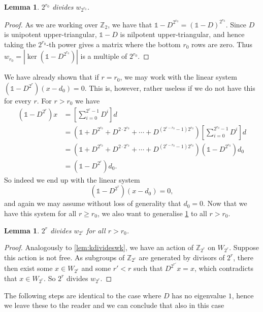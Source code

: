 \documentclass[a4paper]{article}
\theoremstyle{plain}
\newtheorem{lemma}[theorem]{Lemma}
\theoremstyle{definition}
\theoremstyle{remark}
\newcommand{\I}{\mathds{1}}
\newcommand{\ZZ}{{\mathbb{Z}}}
\begin{document}
\begin{lemma}
	\label{lem:2r0dividesw2r0}
	\(2^{r_0}\) divides \(w_{2^{r_0}}\).
\end{lemma}
\begin{proof}
	As we are working over \(\ZZ_2\), we have that \(\I-D^{2^{r_0}} = (\I-D)^{2^{r_0}}\). Since \(D\) is unipotent upper-triangular, \(\I-D\) is nilpotent upper-triangular, and hence taking the \(2^{r_0}\)-th power gives a matrix where the bottom \(r_0\) rows are zero. Thus \(w_{r_0} = |\ker(\I-D^{2^{r_0}})|\) is a multiple of \(2^{r_0}\).
\end{proof}
We have already shown that if \(r = r_0\), we may work with the linear system \((\I-D^{2^{r}})(x-d_0) = 0\). This is, however, rather useless if we do not have this for every \(r\). For \(r > r_0\) we have
\begin{align*}
(\I-D^{2^r})x &= \left[\sum_{i=0}^{2^{r}-1} D^i\right] d\\
&= (\I + D^{2^{r_0}} +  D^{2 \cdot 2^{r_0}} + \cdots +  D^{(2^{r-r_0}-1)2^{r_0}})\left[\sum_{i=0}^{2^{r_0}-1} D^i\right] d\\
&= (\I + D^{2^{r_0}} +  D^{2 \cdot 2^{r_0}} + \cdots +  D^{(2^{r-r_0}-1)2^{r_0}})(\I-D^{2^{r_0}})d_0\\
&=(\I-D^{2^r})d_0.
\end{align*}
So indeed we end up with the linear system
\begin{equation*}
(\I-D^{2^{r}})(x-d_0) = 0,
\end{equation*}
and again we may assume without loss of generality that \(d_0 = 0\). Now that we have this system for all \(r \geq r_0\), we also want to generalise \cref{lem:2r0dividesw2r0} to all \(r > r_0\). 

\begin{lemma}
	\(2^{r}\) divides \(w_{2^{r}}\) for all \(r > r_0\).
\end{lemma}
\begin{proof}
	Analogously to \cref{lem:kdivideswk}, we have an action of \(\ZZ_{2^r}\) on \(W_{2^r}\). Suppose this action is not free. As subgroups of \(\ZZ_{2^r}\) are generated by divisors of \(2^r\), there then exist some \(x \in W_{2^r} \) and some \(r' < r\) such that \(D^{2^{r'}}x = x\), which contradicts that \(x \in W_{2^r}\). So \(2^r \) divides \(w_{2^r}\).
\end{proof}


The following steps are identical to the case where \(D\) has no eigenvalue \(1\), hence we leave these to the reader and we can conclude that also in this case
\end{document}
